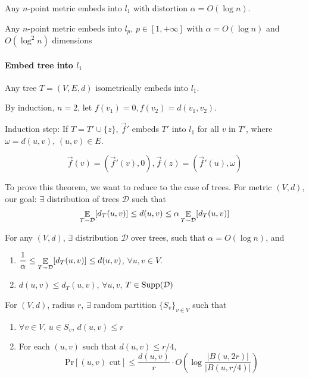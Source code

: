 \begin{theorem}[Bourgain' 1985]
    Any  $ n $-point metric embeds into  $ l_1 $ with distortion  $ \alpha=O(\log n) $.   
\end{theorem}
\begin{theorem}[LLR 1995]
    Any  $ n $-point metric embeds into  $ l_p $,  $ p\in [1,+\infty] $ with  $ \alpha=O(\log n) $ and  $ O(\log ^2 n) $ dimensions     
\end{theorem}
\paragraph{Embed tree into  $ l_1 $} Any tree  $ T=(V,E,d) $ isometrically embeds into  $ l_1 $.

By induction,  $ n=2 $, let  $ f(v_1)=0,f(v_2)=d(v_1,v_2) $.

Induction step: If  $ T=T'\cup\{z\} $,  $ \vec{f}' $ embeds  $ T' $  into  $ l_1 $ for all  $ v $ in  $ T' $, where $ \omega=d(u,v) $,  $ (u,v)\in E $.  

\[\vec{f}(v)=(\vec{f}'(v),0),\vec{f}(z)=(\vec{f}'(u),\omega)\] 

To prove this theorem, we want to reduce to the case of trees.
For metric  $ (V,d) $, our goal:  $ \exists $  distribution of trees  $ \mathcal{D} $  such that 
\[\mathop\mathbb E_{T\sim \mathcal{D}}[d_T(u,v)] \leq d(u,v) \leq \alpha\mathop\mathbb E_{T\sim \mathcal{D}}[d_T(u,v)]\]

\begin{theorem}
    For any  $ (V,d) $,  $ \exists  $ distribution  $ \mathcal{D} $ over trees, such that  $ \alpha=O(\log n) $, and 
    \begin{enumerate}[label=\arabic*)]
        \item  $ \displaystyle\frac{1}{\alpha} \leq \mathop\mathbb E_{T\sim \mathcal{D}}[d_T(u,v)] \leq d(u,v) $,  $ \forall u,v\in V $.
        \item  $ d(u,v) \leq d_T(u,v) $,  $ \forall u,v $,  $ T\in \mathrm{Supp}(\mathcal D) $     
    \end{enumerate}   
\end{theorem}

\begin{theorem}
    For  $ (V,d) $, radius  $ r $,  $ \exists  $ random partition  $ \{S_v\}_{v\in V} $ such that 
    \begin{enumerate}[label=\arabic*)]
        \item  $ \forall v\in V $,  $ u\in S_v $,  $ d(u,v) \leq r $
        \item For each  $ (u,v) $ such that  $ d(u,v) \leq r/4 $, 
        \[\mathrm{Pr}[(u,v)\text{ cut}] \leq \frac{d(u,v)}{r}\cdot O\left(\log \frac{|B(u,2r)|}{|B(u,r/4)|}\right)\]
    \end{enumerate}    
    
\end{theorem}